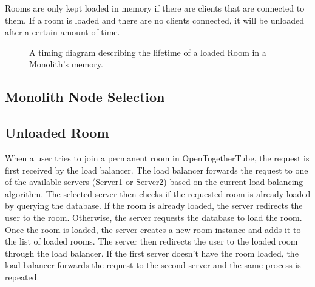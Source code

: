 Rooms are only kept loaded in memory if there are clients that are connected to them. If a room is loaded and there are no clients connected, it will be unloaded after a certain amount of time.

\begin{figure}[!htb]
  \centering
  \caption{\label{Figure::room-keepalive-timing} A timing diagram describing the lifetime of a loaded Room in a Monolith's memory.}
\end{figure}

\subsection{Monolith Node Selection}

\subsection{Unloaded Room}
When a user tries to join a permanent room in OpenTogetherTube, the request is first received by the load balancer.
The load balancer forwards the request to one of the available servers (Server1 or Server2) based on the current load
balancing algorithm. The selected server then checks if the requested room is already loaded by querying the database.
If the room is already loaded, the server redirects the user to the room. Otherwise, the server requests the database to
load the room. Once the room is loaded, the server creates a new room instance and adds it to the list of loaded rooms.
The server then redirects the user to the loaded room through the load balancer. If the first server doesn't have the
room loaded, the load balancer forwards the request to the second server and the same process is repeated.

